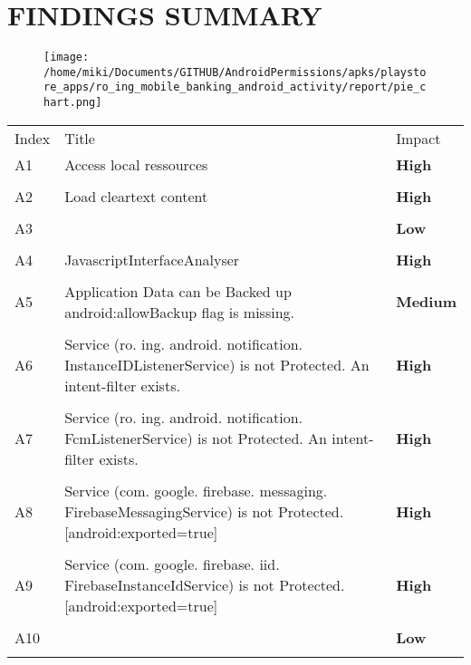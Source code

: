 \documentclass[12p]{article}
\begin{document}
\section{FINDINGS SUMMARY}\label{sec:summary}
\begin{figure}[H]
\centering
	\texttt{[image: /home/miki/Documents/GITHUB/AndroidPermissions/apks/playstore\_apps/ro\_ing\_mobile\_banking\_android\_activity/report/pie\_chart.png]}
\end{figure}
	\begin{longtable}{p{0.5cm} p{10cm} p{1.5cm}}
	\rowcolor{grannysmithapple!70} Index & Title & Impact \\
	A1&Access local ressources& \color{ferrarired}\textbf{High} \\
\hline\\	A2&Load cleartext content& \color{ferrarired}\textbf{High} \\
\hline\\	A3&& \color{amber}\textbf{Low} \\
\hline\\	A4&JavascriptInterfaceAnalyser& \color{ferrarired}\textbf{High} \\
\hline\\	A5&Application Data can be Backed up android:allowBackup flag is missing.& \color{orange(colorwheel)}\textbf{Medium} \\
\hline\\	A6&Service \newline (ro. ing. android. notification. InstanceIDListenerService) is not Protected. An intent-filter exists.& \color{ferrarired}\textbf{High} \\
\hline\\	A7&Service \newline (ro. ing. android. notification. FcmListenerService) is not Protected. An intent-filter exists.& \color{ferrarired}\textbf{High} \\
\hline\\	A8&Service \newline (com. google. firebase. messaging. FirebaseMessagingService) is not Protected. [android:exported=true]& \color{ferrarired}\textbf{High} \\
\hline\\	A9&Service \newline (com. google. firebase. iid. FirebaseInstanceIdService) is not Protected. [android:exported=true]& \color{ferrarired}\textbf{High} \\
\hline\\	A10&& \color{amber}\textbf{Low} \\
\hline\\	\end{longtable}
\cleardoublepage
\newpage
\end{document}

